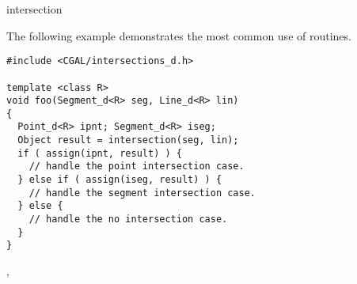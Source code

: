 \begin{ccRefFunction}{intersection}
\ccExample

The following example demonstrates the most common use of 
 routines.
\ccHtmlLinksOff%
\begin{verbatim}
#include <CGAL/intersections_d.h>

template <class R>
void foo(Segment_d<R> seg, Line_d<R> lin)
{
  Point_d<R> ipnt; Segment_d<R> iseg;
  Object result = intersection(seg, lin);
  if ( assign(ipnt, result) ) {
    // handle the point intersection case.
  } else if ( assign(iseg, result) ) {
    // handle the segment intersection case.
  } else {
    // handle the no intersection case.
  }
}
\end{verbatim}%
\ccHtmlLinksOn%

\ccSeeAlso
{},  
\end{ccRefFunction}

  

